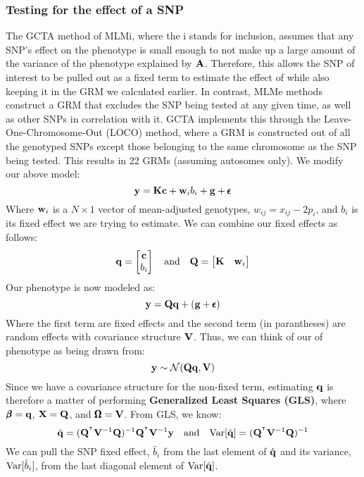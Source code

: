 \documentclass[12pt]{article}
\begin{document}
\subsubsection{Testing for the effect of a SNP}
The GCTA method of MLMi, where the i stands for inclusion, assumes that any SNP's effect on the phenotype is small enough to not make up a large amount of the variance of the phenotype explained by $\mathbf{A}$.
Therefore, this allows the SNP of interest to be pulled out as a fixed term to estimate the effect of while also keeping it in the GRM we calculated earlier.
In contrast, MLMe methods construct a GRM that excludes the SNP being tested at any given time, as well as other SNPs in correlation with it.
GCTA implements this through the Leave-One-Chromosome-Out (LOCO) method, where a GRM is constructed out of all the genotyped SNPs except those belonging to the same chromosome as the SNP being tested.
This results in 22 GRMs (assuming autosomes only).
We modify our above model:
$$ \mathbf{y} = \mathbf{K} \mathbf{c} + \mathbf{w}_i b_i + \mathbf{g} + \pmb{\epsilon} $$
Where $\mathbf{w}_i$ is a $N \times 1$ vector of mean-adjusted genotypes, $w_{ij} = x_{ij} - 2 p_i$, and $b_i$ is its fixed effect we are trying to estimate. We can combine our fixed effects as follows:
\begin{equation*}
\mathbf{q} = \begin{bmatrix} \mathbf{c} \\ b_i \end{bmatrix}
\quad\mathrm{and}\quad
\mathbf{Q} = \begin{bmatrix} \mathbf{K} & \mathbf{w}_i \end{bmatrix}
\end{equation*}
Our phenotype is now modeled as:
$$ \mathbf{y} = \mathbf{Q} \mathbf{q} + (\mathbf{g} + \pmb{\epsilon}) $$
Where the first term are fixed effects and the second term (in parantheses) are random effects with covariance structure $\mathbf{V}$. Thus, we can think of our of phenotype as being drawn from:
$$ \mathbf{y} \sim \mathcal{N} (\mathbf{Q} \mathbf{q}, \mathbf{V}) $$
Since we have a covariance structure for the non-fixed term, estimating $\mathbf{q}$ is therefore a matter of performing \textbf{Generalized Least Squares (GLS)}, where $\pmb{\beta} = \mathbf{q}$, $\mathbf{X} = \mathbf{Q}$, and $\pmb{\Omega} = \mathbf{V}$. From GLS, we know:
\begin{equation*}
    \hat{\mathbf{q}} = (\mathbf{Q}^{^\intercal} \mathbf{V}^{-1} \mathbf{Q})^{-1} \mathbf{Q}^{^\intercal} \mathbf{V}^{-1} \mathbf{y}
    \quad\mathrm{and}\quad
    \mathrm{Var}[\hat{\mathbf{q}}] = (\mathbf{Q}^{^\intercal} \mathbf{V}^{-1} \mathbf{Q})^{-1}
\end{equation*}
We can pull the SNP fixed effect, $\hat{b}_i$ from the last element of $\hat{\mathbf{q}}$ and its variance, $\mathrm{Var}[\hat{b}_i]$, from the last diagonal element of $\mathrm{Var}[\hat{\mathbf{q}}]$.
\end{document}
